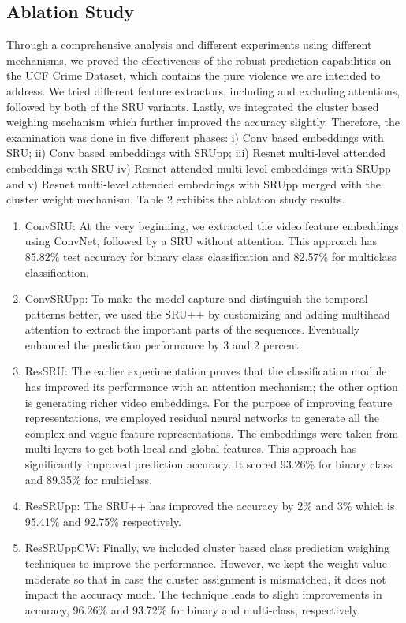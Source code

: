 \documentclass[runningheads]{llncs}
\begin{document}
\subsection{Ablation Study}

Through a comprehensive analysis and different experiments using different mechanisms, we proved the effectiveness of the robust prediction capabilities on the UCF Crime Dataset, which contains the pure violence we are intended to address. We tried different feature extractors, including and excluding attentions, followed by both of the SRU variants. Lastly, we integrated the cluster based weighing mechanism which further improved the accuracy slightly. Therefore, the examination was done in five different phases: i) Conv based embeddings with SRU; ii) Conv based embeddings with SRUpp; iii) Resnet multi-level attended embeddings with SRU iv) Resnet attended multi-level embeddings with SRUpp and v) Resnet multi-level attended embeddings with SRUpp merged with the cluster weight mechanism. Table 2 exhibits the ablation study results.\\

\begin{enumerate}
    \item ConvSRU: At the very beginning, we extracted the video feature embeddings using ConvNet, followed by a SRU without attention. This approach has 85.82\% test accuracy for binary class classification and 82.57\%  for multiclass classification.

    \item ConvSRUpp: To make the model capture and distinguish the temporal patterns better, we used the SRU++  by customizing and adding multihead attention to extract the important parts of the sequences. Eventually enhanced the prediction performance by 3 and 2 percent.

    \item ResSRU:  The earlier experimentation proves that the classification module has improved its performance with an attention mechanism; the other option is generating richer video embeddings. For the purpose of improving feature representations, we employed residual neural networks to generate all the complex and vague feature representations. The embeddings were taken from multi-layers to get both local and global features. This approach has significantly improved prediction accuracy. It scored 93.26\% for binary class and 89.35\% for multiclass.

    \item ResSRUpp: The SRU++ has improved the accuracy by 2\% and 3\% which is 95.41\% and 92.75\% respectively.

    \item ResSRUppCW: Finally, we included cluster based class prediction weighing techniques to improve the performance. However, we kept the weight value moderate so that in case the cluster assignment is mismatched, it does not impact the accuracy much.  The technique leads to slight improvements in accuracy, 96.26\% and 93.72\% for binary and multi-class, respectively.
\end{enumerate}
\end{document}
